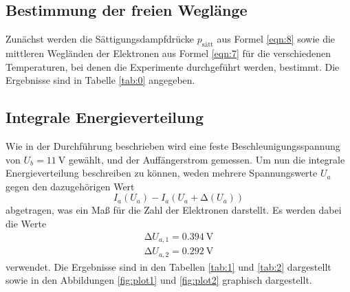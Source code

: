 
\subsection{Bestimmung der freien Weglänge}
Zunächst werden die Sättigungsdampfdrücke $p_{\text{sätt}}$ aus Formel \eqref{eqn:8} sowie die mittleren Wegländen der Elektronen aus Formel \eqref{eqn:7} für die verschiedenen Temperaturen, bei denen die Experimente durchgeführt werden, bestimmt.
Die Ergebnisse sind in Tabelle \ref{tab:0} angegeben.


\subsection{Integrale Energieverteilung}
Wie in der Durchführung beschrieben wird eine feste Beschleunigungsspannung von $U_b = \SI{11}{\volt}$ gewählt, und der Auffängerstrom gemessen.
Um nun die integrale Energieverteilung beschreiben zu können, weden mehrere Spannungswerte $U_a$ gegen den dazugehörigen Wert
\begin{equation}
  I_a(U_a) - I_a(U_a + \increment(U_a))
\end{equation}
abgetragen, was ein Maß für die Zahl der Elektronen darstellt. %
Es werden dabei die Werte
\begin{align*}
  \increment U_{a,1} = \SI{0,394}{\volt} \\
  \increment U_{a,2} = \SI{0.292}{\volt}
\end{align*}
verwendet.
Die Ergebnisse sind in den Tabellen \ref{tab:1} und \ref{tab:2} dargestellt sowie in den Abbildungen \ref{fig:plot1} und \ref{fig:plot2} graphisch dargestellt.

